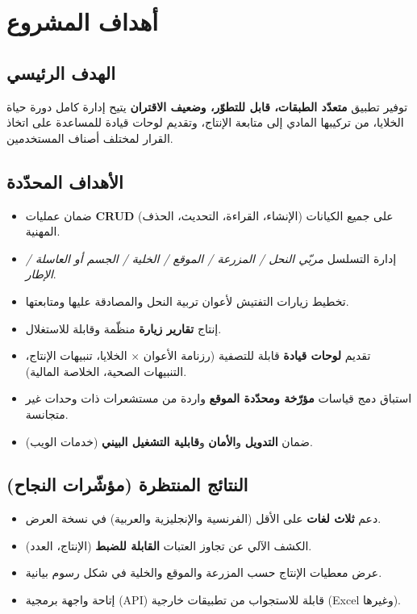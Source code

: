\chapter{أهداف المشروع}

\section{الهدف الرئيسي}
توفير تطبيق \textbf{متعدّد الطبقات، قابل للتطوّر، وضعيف الاقتران} يتيح إدارة كامل
دورة حياة الخلايا، من تركيبها المادي إلى متابعة الإنتاج، وتقديم لوحات قيادة
للمساعدة على اتخاذ القرار لمختلف أصناف المستخدمين.

\section{الأهداف المحدّدة}
\begin{itemize}
  \item ضمان عمليات \textbf{CRUD} (الإنشاء، القراءة، التحديث، الحذف) على جميع الكيانات المهنية.
  \item إدارة التسلسل \emph{مربّي النحل / المزرعة / الموقع / الخلية / الجسم أو العاسلة / الإطار}.
  \item تخطيط زيارات التفتيش لأعوان تربية النحل والمصادقة عليها ومتابعتها.
  \item إنتاج \textbf{تقارير زيارة} منظّمة وقابلة للاستغلال.
  \item تقديم \textbf{لوحات قيادة} قابلة للتصفية (رزنامة الأعوان $\times$ الخلايا، تنبيهات الإنتاج، التنبيهات الصحية، الخلاصة المالية).
  \item استباق دمج قياسات \textbf{مؤرّخة ومحدّدة الموقع} واردة من مستشعرات ذات وحدات غير متجانسة.
  \item ضمان \textbf{التدويل} و\textbf{الأمان} و\textbf{قابلية التشغيل البيني} (خدمات الويب).
\end{itemize}

\section{النتائج المنتظرة (مؤشّرات النجاح)}
\begin{itemize}
  \item دعم \textbf{ثلاث لغات} على الأقل (الفرنسية والإنجليزية والعربية) في نسخة العرض.
  \item الكشف الآلي عن تجاوز العتبات \textbf{القابلة للضبط} (الإنتاج، العدد).
  \item عرض معطيات الإنتاج حسب المزرعة والموقع والخلية في شكل رسوم بيانية.
  \item إتاحة واجهة برمجية (\textenglish{API}) قابلة للاستجواب من تطبيقات خارجية (\textenglish{Excel} وغيرها).
\end{itemize}
